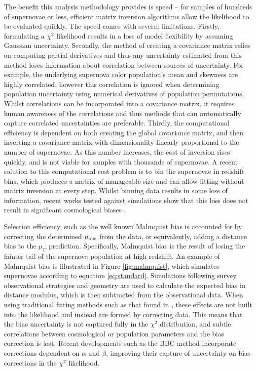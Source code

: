 \documentclass[twocolumn,trackchanges,tighten]{aastex62}
\begin{document}
The benefit this analysis methodology provides is speed -- for samples of hundreds of supernovae or less, efficient matrix inversion algorithms allow the likelihood to be evaluated quickly. The speed comes with several limitations. Firstly, formulating a $\chi^2$ likelihood results in a loss of model flexibility by assuming Gaussian uncertainty. Secondly, the method of creating a covariance matrix relies on computing partial derivatives and thus any uncertainty estimated from this method loses information about correlation between sources of uncertainty. For example, the underlying supernova color population's mean and skewness are highly correlated, however this correlation is ignored when determining population uncertainty using numerical derivatives of population permutations. Whilst correlations can be incorporated into a covariance matrix, it requires human awareness of the correlations and thus methods that can automatically capture correlated uncertainties are preferable. Thirdly, the computational efficiency is dependent on both creating the global covariance matrix, and then inverting a covariance matrix with dimensionality linearly proportional to the number of supernovae. As this number increases, the cost of inversion rises quickly, and is not viable for samples with thousands of supernovae. A recent solution to this computational cost problem is to bin the supernovae in redshift bins, which produces a matrix of manageable size and can allow fitting without matrix inversion at every step. Whilst binning data results in some loss of information, recent works tested against simulations show that this loss does not result in significant cosmological biases \citep{Scolnic2016, Kessler2017}.

Selection efficiency, such as the well known Malmquist bias \citep{MalmquistK.G.1922} is accounted for by correcting the determined $\mu_{\rm obs}$ from the data, or equivalently, adding a distance bias to the $\mu_C$ prediction. Specifically, Malmquist bias is the result of losing the fainter tail of the supernova population at high redshift. An example of Malmquist bias is illustrated in Figure \ref{fig:malmquist}, which simulates supernovae according to equation \eqref{eq:standard}. Simulations following survey observational strategies and geometry are used to calculate the expected bias in distance modulus, which is then subtracted from the observational data. When using traditional fitting methods such as that found in \citet{Betoule2014}, these effects are not built into the likelihood and instead are formed by correcting data. This means that the bias uncertainty is not captured fully in the $\chi^2$ distribution, and subtle correlations between cosmological or population parameters and the bias correction is lost. Recent developments such as the BBC method \citep{Kessler2017} incorporate corrections dependent on $\alpha$ and $\beta$, improving their capture of uncertainty on bias corrections in the $\chi^2$ likelihood.
\end{document}
